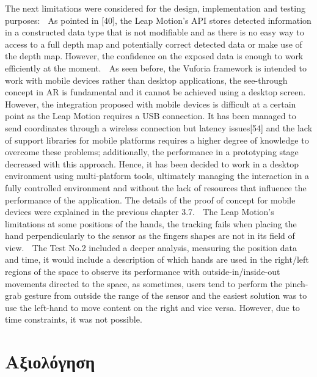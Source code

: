 The next limitations were considered for the design, implementation and testing purposes:  As pointed in [40], the Leap Motion’s API stores detected information in a constructed data type that is not modifiable and as there is no easy way to access to a full depth map and potentially correct detected data or make use of the depth map. However, the confidence on the exposed data is enough to work efficiently at the moment.  As seen before, the Vuforia framework is intended to work with mobile devices rather than desktop applications, the see-through concept in AR is fundamental and it cannot be achieved using a desktop screen. However, the integration proposed with mobile devices is difficult at a certain point as the Leap Motion requires a USB connection. It has been managed to send coordinates through a wireless connection but latency issues[54] and the lack of support libraries for mobile platforms requires a higher degree of knowledge to overcome these problems; additionally, the performance in a prototyping stage decreased with this approach. Hence, it has been decided to work in a desktop environment using multi-platform tools, ultimately managing the interaction in a fully controlled environment and without the lack of resources that influence the performance of the application. The details of the proof of concept for mobile devices were explained in the previous chapter 3.7.  The Leap Motion’s limitations at some positions of the hands, the tracking fails when placing the hand perpendicularly to the sensor as the fingers shapes are not in its field of view.  The Test No.2 included a deeper analysis, measuring the position data and time, it would include a description of which hands are used in the right/left regions of the space to observe its performance with outside-in/inside-out movements directed to the space, as sometimes, users tend to perform the pinch-grab gesture from outside the range of the sensor and the easiest solution was to use the left-hand to move content on the right and vice versa. However, due to time constraints, it was not possible.

\section{Αξιολόγηση}
